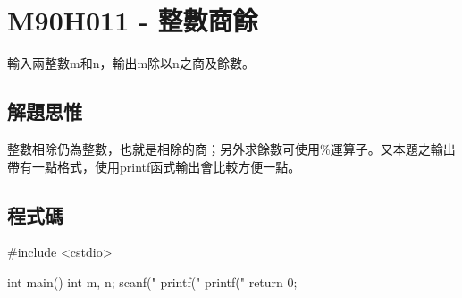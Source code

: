 \section{M90H011 - 整數商餘}
輸入兩整數m和n，輸出m除以n之商及餘數。
\subsection{解題思惟}
整數相除仍為整數，也就是相除的商；另外求餘數可使用\%運算子。又本題之輸出帶有一點格式，使用printf函式輸出會比較方便一點。
\subsection{程式碼}
\begin{cppcode}
#include <cstdio>

int main()
{
	int m, n;
	scanf("%
	printf("\n%
	printf("\n%
	return 0;
}
\end{cppcode}
